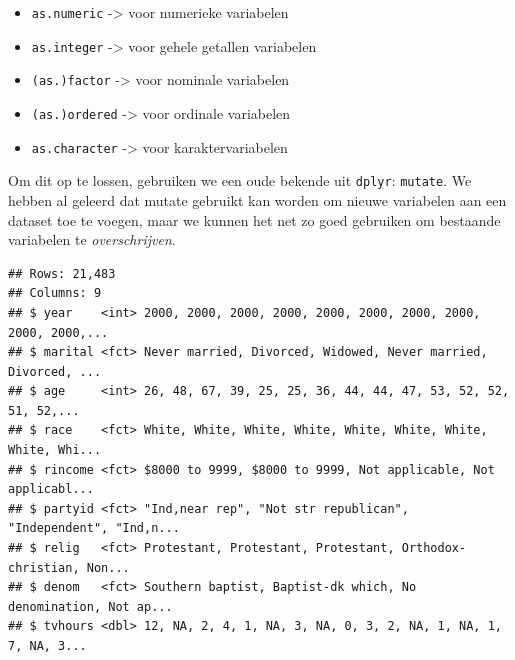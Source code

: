 \documentclass[]{tufte-book}
\newenvironment{Shaded}{}{}
\newcommand{\DataTypeTok}[1]{\textcolor[rgb]{0.56,0.13,0.00}{#1}}
\newcommand{\KeywordTok}[1]{\textcolor[rgb]{0.00,0.44,0.13}{\textbf{#1}}}
\newcommand{\NormalTok}[1]{#1}
\newcommand{\OperatorTok}[1]{\textcolor[rgb]{0.40,0.40,0.40}{#1}}
\newcommand{\StringTok}[1]{\textcolor[rgb]{0.25,0.44,0.63}{#1}}
\providecommand{\tightlist}{%
  \setlength{\itemsep}{0pt}\setlength{\parskip}{0pt}}
\begin{document}
\begin{itemize}
\tightlist
\item
  \texttt{as.numeric} -\textgreater{} voor numerieke variabelen
\item
  \texttt{as.integer} -\textgreater{} voor gehele getallen variabelen
\item
  \texttt{(as.)factor} -\textgreater{} voor nominale variabelen
\item
  \texttt{(as.)ordered} -\textgreater{} voor ordinale variabelen
\item
  \texttt{as.character} -\textgreater{} voor karaktervariabelen
\end{itemize}

Om dit op te lossen, gebruiken we een oude bekende uit \texttt{dplyr}: \texttt{mutate}. We hebben al geleerd dat mutate gebruikt kan worden om nieuwe variabelen aan een dataset toe te voegen, maar we kunnen het net zo goed gebruiken om bestaande variabelen te \emph{overschrijven}.

\begin{Shaded}
\end{Shaded}

\begin{verbatim}
## Rows: 21,483
## Columns: 9
## $ year    <int> 2000, 2000, 2000, 2000, 2000, 2000, 2000, 2000, 2000, 2000,...
## $ marital <fct> Never married, Divorced, Widowed, Never married, Divorced, ...
## $ age     <int> 26, 48, 67, 39, 25, 25, 36, 44, 44, 47, 53, 52, 52, 51, 52,...
## $ race    <fct> White, White, White, White, White, White, White, White, Whi...
## $ rincome <fct> $8000 to 9999, $8000 to 9999, Not applicable, Not applicabl...
## $ partyid <fct> "Ind,near rep", "Not str republican", "Independent", "Ind,n...
## $ relig   <fct> Protestant, Protestant, Protestant, Orthodox-christian, Non...
## $ denom   <fct> Southern baptist, Baptist-dk which, No denomination, Not ap...
## $ tvhours <dbl> 12, NA, 2, 4, 1, NA, 3, NA, 0, 3, 2, NA, 1, NA, 1, 7, NA, 3...
\end{verbatim}
\end{document}

